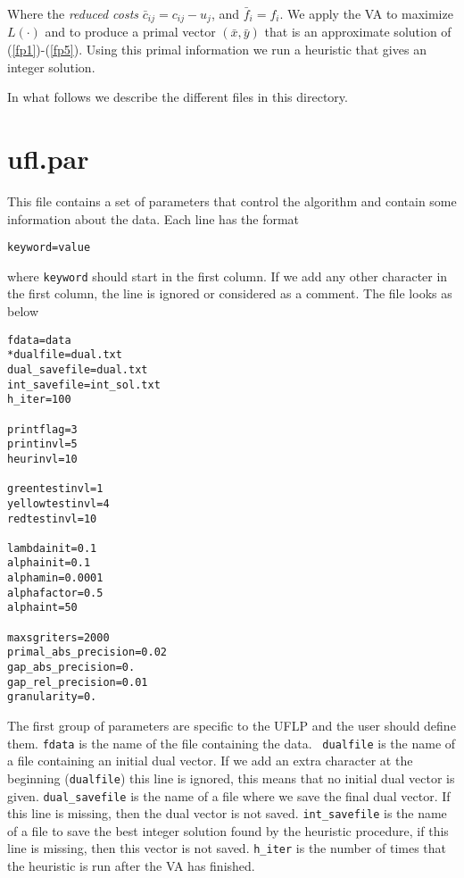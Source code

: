 \documentclass{article}
\begin{document}
\noindent Where the {\it reduced costs} $\bar c_{ij}=c_{ij}-u_j$, and
$\bar f_i = f_i$. We apply the VA to maximize $L(\cdot)$ and to produce a
primal vector $(\bar x, \bar y)$ that is an approximate solution of
(\ref{fp1})-(\ref{fp5}). Using this primal information we run a heuristic
that gives an integer solution.

In what follows we describe the different files in this directory.


\section{ufl.par}

This file contains a set of parameters that control the algorithm and contain
some information about the data. Each line has the format

{\tt keyword=value}

\noindent where {\tt keyword} should start in the first column. If we add any
other character in the first column, the line is ignored or considered as a
comment. The file looks as below

\bigskip
\begin{verbatim}
fdata=data
*dualfile=dual.txt
dual_savefile=dual.txt
int_savefile=int_sol.txt
h_iter=100

printflag=3
printinvl=5
heurinvl=10

greentestinvl=1
yellowtestinvl=4
redtestinvl=10

lambdainit=0.1
alphainit=0.1
alphamin=0.0001
alphafactor=0.5
alphaint=50

maxsgriters=2000
primal_abs_precision=0.02
gap_abs_precision=0.
gap_rel_precision=0.01
granularity=0.
\end{verbatim}

The first group of parameters are specific to the UFLP and the user should
define them. {\tt fdata} is the name of the file containing the data. {\tt
dualfile} is the name of a file containing an initial dual vector. If we add
an extra character at the beginning ({\tt *dualfile}) this line is ignored,
this means that no initial dual vector is given. {\tt dual\_savefile} is the
name of a file where we save the final dual vector. If this line is missing,
then the dual vector is not saved. {\tt int\_savefile} is the name of a file
to save the best integer solution found by the heuristic procedure, if this
line is missing, then this vector is not saved. {\tt h\_iter} is the number of
times that the heuristic is run after the VA has finished.
\end{document}

